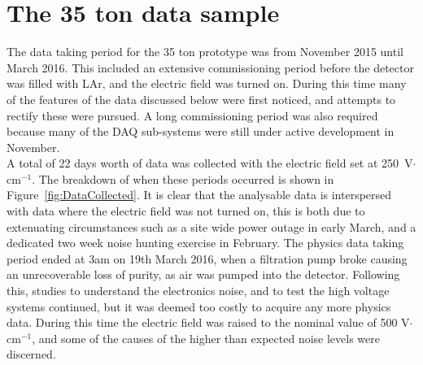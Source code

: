 
\chapter{The 35 ton data sample} \label{chap:35tonData} %

\graphicspath{{35tonData/Figs/PDF/}{35tonData/Figs/Raster/}{35tonData/Figs/Vector/}}


The data taking period for the 35 ton prototype was from November 2015 until March 2016. This included an extensive commissioning period before the detector was filled with LAr, and the electric field was turned on. During this time many of the features of the data discussed below were first noticed, and attempts to rectify these were pursued. A long commissioning period was also required because many of the DAQ sub-systems were still under active development in November.\\

A total of 22 days worth of data was collected with the electric field set at 250~V$\cdot$cm$^{-1}$. The breakdown of when these periods occurred is shown in Figure~\ref{fig:DataCollected}. It is clear that the analysable data is interspersed with data where the electric field was not turned on, this is both due to extenuating circumstances such as a site wide power outage in early March, and a dedicated two week noise hunting exercise in February. The physics data taking period ended at 3am on 19th March 2016, when a filtration pump broke causing an unrecoverable loss of purity, as air was pumped into the detector. Following this, studies to understand the electronics noise, and to test the high voltage systems continued, but it was deemed too costly to acquire any more physics data. During this time the electric field was raised to the nominal value of 500 V$\cdot$cm$^{-1}$, and some of the causes of the higher than expected noise levels were discerned. \\

